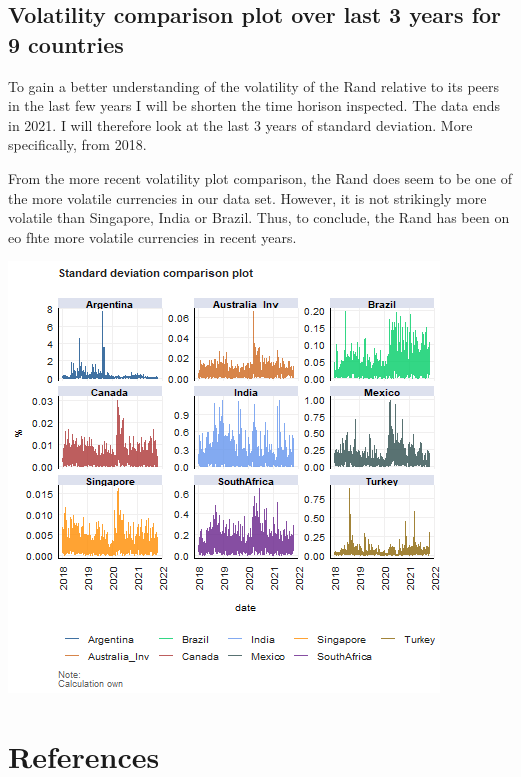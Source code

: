 \documentclass[11pt,preprint, authoryear]{elsarticle}
\let\origfigure\figure
\let\endorigfigure\endfigure
\renewenvironment{figure}[1][2] {
    \expandafter\origfigure\expandafter[H]
} {
    \endorigfigure
}
\numberwithin{equation}{section}
\numberwithin{figure}{section}
\numberwithin{table}{section}
\begin{document}
\hypertarget{volatility-comparison-plot-over-last-3-years-for-9-countries}{%
\subsection{Volatility comparison plot over last 3 years for 9
countries}\label{volatility-comparison-plot-over-last-3-years-for-9-countries}}

To gain a better understanding of the volatility of the Rand relative to
its peers in the last few years I will be shorten the time horison
inspected. The data ends in 2021. I will therefore look at the last 3
years of standard deviation. More specifically, from 2018.

From the more recent volatility plot comparison, the Rand does seem to
be one of the more volatile currencies in our data set. However, it is
not strikingly more volatile than Singapore, India or Brazil. Thus, to
conclude, the Rand has been on eo fhte more volatile currencies in
recent years.

\begin{figure}[H]

{\centering \includegraphics{Question-5_files/figure-latex/Figure 2-1} 

}

\caption{3 year volatility comparison plot \label{Figure2}}\label{fig:Figure 2}
\end{figure}

\hypertarget{references}{%
\section*{References}\label{references}}
\end{document}
